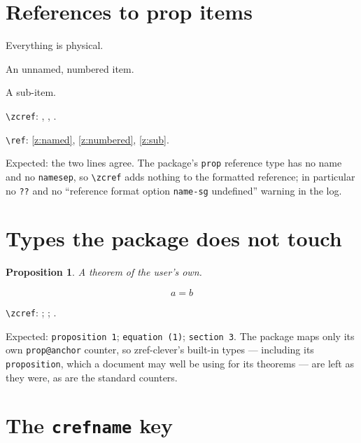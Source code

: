 \documentclass{article}
\newtheorem{proposition}{Proposition}
\begin{document}
\section{References to prop items}

\begin{prop}
  \item[Physicalism] Everything is physical. \label{z:named}
  \item An unnamed, numbered item. \label{z:numbered}
  \begin{prop}
    \item A sub-item. \label{z:sub}
  \end{prop}
\end{prop}

\verb|\zcref|: , , .

\verb|\ref|: \ref{z:named}, \ref{z:numbered}, \ref{z:sub}.

Expected: the two lines agree.  The package's \texttt{prop} reference type has
no name and no \texttt{namesep}, so \verb|\zcref| adds nothing to the formatted
reference; in particular no \texttt{??} and no ``reference format option
\texttt{name-sg} undefined'' warning in the log.

\section{Types the package does not touch}

\begin{proposition} \label{z:thm} A theorem of the user's own. \end{proposition}

\begin{equation} a = b \label{z:eq} \end{equation}

\verb|\zcref|: ; ; .

Expected: \texttt{proposition 1}; \texttt{equation (1)}; \texttt{section 3}.
The package maps only its own \texttt{prop@anchor} counter, so zref-clever's
built-in types --- including its \texttt{proposition}, which a document may
well be using for its theorems --- are left as they were, as are the standard
counters.

\section{The \texttt{crefname} key} \label{z:sec}
\end{document}
